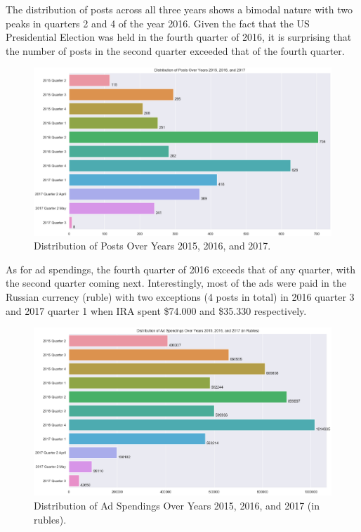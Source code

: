 \documentclass[11pt]{article}
\begin{document}
The distribution of posts across all three years shows a bimodal nature with
two peaks in quarters 2 and 4 of the year 2016. Given the fact that the US
Presidential Election was held in the fourth quarter of 2016, it is surprising
that the number of posts in the second quarter exceeded that of the fourth
quarter.

\begin{figure}[H]
\centering
\includegraphics[width=\linewidth]{./image/barchart-plots/barchart_distribution_of_posts.png}
\caption{Distribution of Posts Over Years 2015, 2016, and 2017.}
\end{figure}

As for ad spendings, the fourth quarter of 2016 exceeds that of any quarter,
with the second quarter coming next. Interestingly, most of the ads were paid
in the Russian currency (ruble) with two exceptions (4 posts in total) in 2016
quarter 3 and 2017 quarter 1 when IRA spent \$74.000 and \$35.330 respectively.

\begin{figure}[H]
\centering
\includegraphics[width=\linewidth]{./image/barchart-plots/barchart_ad_spend_RU_distribution.png}
\caption{Distribution of Ad Spendings Over Years 2015, 2016, and 2017 (in rubles).}
\end{figure}
\end{document}
